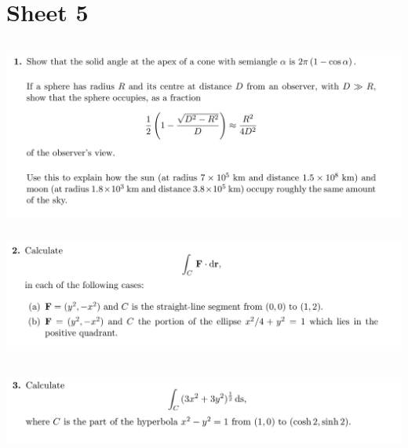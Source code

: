 \newpage
\section{Sheet 5}

\subsection{}
\begin{mdframed}
  \includegraphics[width=400pt]{img/oxford-prelims-M5-multivariable-calc-5-1.png}
\end{mdframed}

\subsection{}
\begin{mdframed}
  \includegraphics[width=400pt]{img/oxford-prelims-M5-multivariable-calc-5-2.png}
\end{mdframed}

\subsection{}
\begin{mdframed}
  \includegraphics[width=400pt]{img/oxford-prelims-M5-multivariable-calc-5-3.png}
\end{mdframed}

